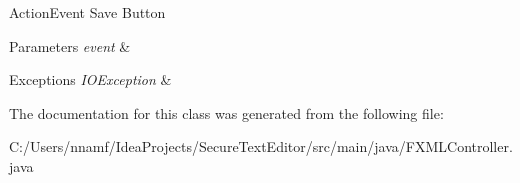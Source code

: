 Action\+Event Save Button 
\begin{DoxyParams}{Parameters}
{\em event} & \\
\hline
\end{DoxyParams}

\begin{DoxyExceptions}{Exceptions}
{\em I\+O\+Exception} & \\
\hline
\end{DoxyExceptions}


The documentation for this class was generated from the following file\+:\begin{DoxyCompactItemize}
\item 
C\+:/\+Users/nnamf/\+Idea\+Projects/\+Secure\+Text\+Editor/src/main/java/F\+X\+M\+L\+Controller.\+java\end{DoxyCompactItemize}
